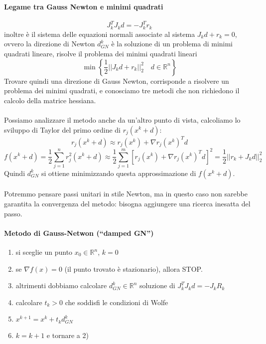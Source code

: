 \paragraph{Legame tra Gauss Newton e minimi quadrati}
$$J_{k}^{T}J_kd = - J_k^{T}r_k$$
inoltre è il sistema delle equazioni normali associate al sistema
$J_kd + r_k=0 $, ovvero la direzione di Newton $d_{GN}^{k}$ è la
soluzione di un problema di minimi quadrati lineare, risolve il
problema dei minimi quadrati lineari
$$ \min \left\{ \frac{1}{2} || J_k d + r_k ||_{2}^{2} \quad d \in \mathbb{R}^{n} \right\} $$
Trovare quindi una direzione di Gauss Newton, corrisponde
a risolvere un problema dei minimi quadrati,
e conosciamo tre metodi che non richiedono
il calcolo della matrice hessiana. \\ \\
Possiamo analizzare il metodo anche da un'altro punto di vista, calcoliamo lo sviluppo di Taylor del primo ordine di $r_j(x^{k}+ d) $:
$$ r_j(x^{k}+ d)  \approx r_j(x^{k}) + \nabla r_j(x^{k})^{T} d$$
$$ f(x^k + d) = 
\frac{1}{2} \displaystyle \sum_{j=1}^{n} r_j^{2}(x^{k} + d) \approx
 \frac{1}{2} \displaystyle \sum_{j=1}^{m}
\left[ r_j(x^{k}) + \nabla r_j(x^{k})^{T}d\right]^{2} = 
\frac{1}{2} || r_k + J_kd ||_{2}^{2} $$
Quindi $d_{GN}^{k}$ si ottiene minimizzando questa approssimazione di $f(x^k + d)$. \\ \\

Potremmo pensare passi unitari in stile Newton, ma in questo caso
non sarebbe garantita la convergenza del metodo: bisogna aggiungere
una ricerca inesatta del passo.

\paragraph{Metodo di Gauss-Netwon (``damped GN'')}
\begin{enumerate}
\item si sceglie un punto $x_0 \in \mathbb{R}^{n}$, $k=0$
\item se $\nabla f(x)=0$ (il punto trovato è stazionario),
      allora STOP.
\item altrimenti dobbiamo calcolare $d^{k}_{GN} \in \mathbb{R}^{n}$ soluzione
      di $J_{k}^{T}J_{k}d = -J_{k}R_{k}$
\item calcolare $t_k > 0 $ che soddisfi le condizioni di Wolfe
\item $x^{k+1} = x^{k} + t_k d_{GN}^{k}$
\item $k = k+1$ e tornare a 2)
\end{enumerate}

